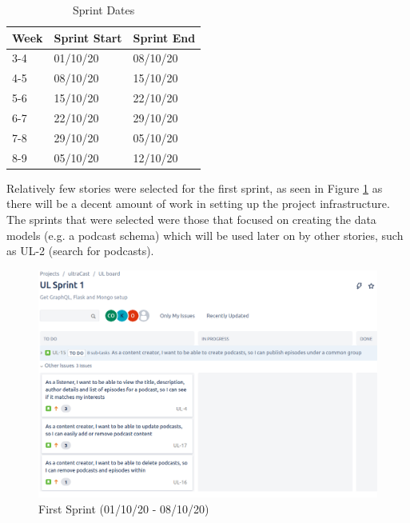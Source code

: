 \documentclass[12pt]{article}
\begin{document}
\begin{table}[h]
    \centering
    \caption{Sprint Dates}
    \label{table:sprint_dates}
    \bigskip
    \begin{tabular}{|l|l|l|}
        \hline
        \textbf{Week} & \textbf{Sprint Start} & \textbf{Sprint End} \\ \hline
        3-4           & 01/10/20              & 08/10/20            \\ \hline
        4-5           & 08/10/20              & 15/10/20            \\ \hline
        5-6           & 15/10/20              & 22/10/20            \\ \hline
        6-7           & 22/10/20              & 29/10/20            \\ \hline
        7-8           & 29/10/20              & 05/10/20            \\ \hline
        8-9           & 05/10/20              & 12/10/20            \\ \hline
    \end{tabular}
\end{table}

Relatively few stories were selected for the first sprint, as seen in Figure \ref{fig:first_sprint}
as there will be a decent amount of work in setting up the project infrastructure.
The sprints that were selected were those that focused on creating the data models
(e.g. a podcast schema) which will be used later on by other stories, such as UL-2
(search for podcasts).

\begin{figure}[h]
    \centering
    \includegraphics[width=\textwidth]{resources/sprint1}
    \caption{First Sprint (01/10/20 - 08/10/20)}
    \label{fig:first_sprint}
\end{figure}
\end{document}
